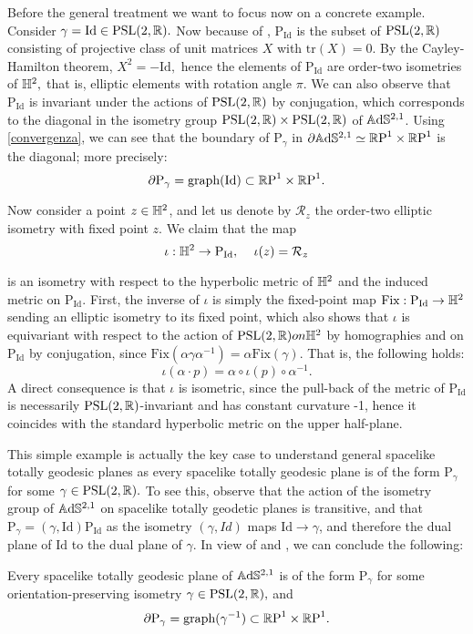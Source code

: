\begin{example}\label{spacelikeisometry}
Before the general treatment we want to focus now on a concrete example. Consider $\gamma=\text{Id}\in\text{PSL}(2,\mathbb{R}).$ Now because of , $\text{P}_{\text{Id}}$ is the subset of $\text{PSL}(2,\mathbb{R})$ consisting of projective class of unit matrices $X$ with $\text{tr}(X)=0$. By the Cayley-Hamilton theorem, $X^2=-\text{Id},$ hence the elements of $\text{P}_{\text{Id}}$ are order-two isometries of $\mathbb{H}^2,$ that is, elliptic elements with rotation angle $\pi$.  We can also observe that $\text{P}_{\text{Id}}$ is invariant under the actions of $\text{PSL}(2,\mathbb{R})$ by conjugation, which corresponds to the diagonal in the isometry group $\text{PSL}(2,\mathbb{R})\times\text{PSL}(2,\mathbb{R})$ of $\mathbb{A}\mathrm{d}\mathbb{S}^{2,1}$. Using \ref{convergenza}, we can see that the boundary of $\text{P}_\gamma$ in $\partial\mathbb{A}\mathrm{d}\mathbb{S}^{2,1}\simeq \mathbb{R}\text{P}^1\times\mathbb{R}\text{P}^1$ is the diagonal; more precisely: 
\begin{equation}\label{graphino}
    \partial\text{P}_\gamma=\text{graph(Id)}\subset \mathbb{R}\text{P}^1\times\mathbb{R}\text{P}^1.
\end{equation}

Now consider a point $z\in\mathbb{H}^2$, and let us denote by $\mathcal{R}_z$ the order-two elliptic isometry with fixed point $z$. We claim that the map 
\[
    \iota:\H^2\to\text{P}_{\text{Id}},\;\;\;\ \iota(z)=\mathcal{R}_z
\]

is an isometry with respect to the hyperbolic metric of $\mathbb{H}^2$ and the induced metric on $\text{P}_{\text{Id}}.$ First, the inverse of $\iota$ is simply the fixed-point map $\text{Fix}:\text{P}_{\text{Id}}\to\mathbb{H}^2$ sending an elliptic isometry to its fixed point, which also shows that $\iota$ is equivariant with respect to the action of $\text{PSL}(2,\mathbb{R}) on \mathbb{H}^2$ by homographies and on $\text{P}_\text{Id}$ by conjugation, since $\text{Fix}(\alpha\gamma\alpha^{-1})=\alpha\text{Fix}(\gamma).$ That is, the following holds: 
\begin{equation}
    \iota(\alpha\cdot p)=\alpha\circ\iota(p)\circ\alpha^{-1}.
\end{equation} 
A direct consequence is that $\iota$ is isometric, since the pull-back of the metric of $\text{P}_\text{Id}$ is necessarily $\text{PSL}(2,\mathbb{R})$-invariant and has constant curvature -1, hence it coincides with the standard hyperbolic metric on the upper half-plane.
\end{example}
This simple example is actually the key case to understand general spacelike totally geodesic planes as every spacelike totally geodesic plane is of the form $\text{P}_\gamma$ for some $\gamma\in\text{PSL}(2,\mathbb{R}).$ To see this, observe that the action of the isometry group of $\mathbb{A}\mathrm{d}\mathbb{S}^{2,1}$ on spacelike totally geodetic planes is transitive, and that $\text{P}_\gamma=(\gamma,\text{Id})\text{P}_{\text{Id}}$ as the isometry $(\gamma,Id)$ maps $\text{Id}\to\gamma$, and therefore the dual plane of $\text{Id}$ to the dual plane of $\gamma.$ In view of  and , we can conclude the following: 
\begin{lemma}\label{32}
    Every spacelike totally geodesic plane of $\mathbb{A}\mathrm{d}\mathbb{S}^{2,1}$ is of the form $\text{P}_\gamma$ for some orientation-preserving isometry $\gamma\in\text{PSL}(2,\mathbb{R}),$ and 
    \[
        \partial\text{P}_\gamma=\text{graph}(\gamma^{-1})\subset\mathbb{R}\text{P}^1\times\mathbb{R}\text{P}^1.
    \]
\end{lemma}
